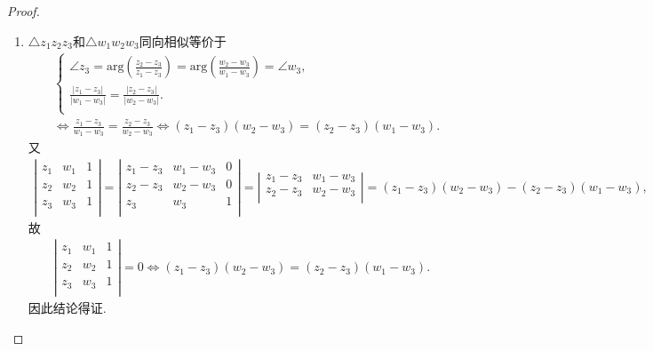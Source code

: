 \documentclass[../../main.tex]{subfiles}%
\begin{document}
\begin{proof}
\begin{enumerate}[(1)]
\item $\triangle z_1z_2z_3$和$\triangle w_1w_2w_3$同向相似等价于
\begin{align*}
&\begin{cases}
\angle z_3=\mathrm{arg}\left( \frac{z_2-z_3}{z_1-z_3} \right) =\mathrm{arg}\left( \frac{w_2-w_3}{w_1-w_3} \right) =\angle w_3,\\
\frac{\left| z_1-z_3 \right|}{\left| w_1-w_3 \right|}=\frac{\left| z_2-z_3 \right|}{\left| w_2-w_3 \right|}.\\
\end{cases}\\
&\Longleftrightarrow \frac{z_1-z_3}{w_1-w_3}=\frac{z_2-z_3}{w_2-w_3}
\Longleftrightarrow \left( z_1-z_3 \right) \left( w_2-w_3 \right) =\left( z_2-z_3 \right) \left( w_1-w_3 \right) .
\end{align*}
又
\begin{gather*}
\left| \begin{matrix}
z_1&		w_1&		1\\
z_2&		w_2&		1\\
z_3&		w_3&		1\\
\end{matrix} \right|=\left| \begin{matrix}
z_1-z_3&		w_1-w_3&		0\\
z_2-z_3&		w_2-w_3&		0\\
z_3&		w_3&		1\\
\end{matrix} \right|=\left| \begin{matrix}
z_1-z_3&		w_1-w_3\\
z_2-z_3&		w_2-w_3\\
\end{matrix} \right|=\left( z_1-z_3 \right) \left( w_2-w_3 \right) -\left( z_2-z_3 \right) \left( w_1-w_3 \right) ,
\end{gather*}
故
\begin{align*}
\left| \begin{matrix}
z_1&		w_1&		1\\
z_2&		w_2&		1\\
z_3&		w_3&		1\\
\end{matrix} \right|=0\Longleftrightarrow \left( z_1-z_3 \right) \left( w_2-w_3 \right) =\left( z_2-z_3 \right) \left( w_1-w_3 \right) .
\end{align*}
因此结论得证.


\end{enumerate}
\end{proof}
\end{document}
